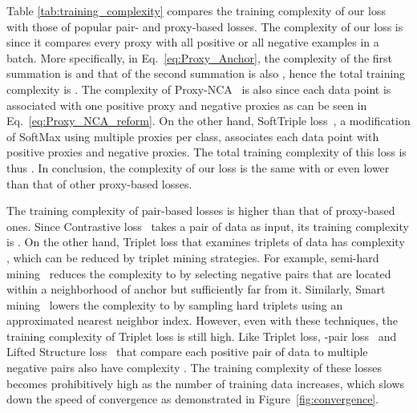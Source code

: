 \documentclass[10pt,twocolumn,letterpaper]{article}
\begin{document}
Table \ref{tab:training_complexity} compares the training complexity of our loss with those of popular pair- and proxy-based losses. 
The complexity of our loss is  since it compares every proxy with all positive or all negative examples in a batch. 
More specifically, in Eq.~\eqref{eq:Proxy_Anchor}, the complexity of the first summation is  and that of the second summation is also , hence the total training complexity is .
The complexity of Proxy-NCA~\cite{movshovitz2017no} is also  since each data point is associated with one positive proxy and  negative proxies as can be seen in Eq.~\eqref{eq:Proxy_NCA_reform}. 
On the other hand, SoftTriple loss~\cite{Qian_2019_ICCV}, a modification of SoftMax using multiple proxies per class, associates each data point with  positive proxies and  negative proxies. 
The total training complexity of this loss is thus . 
In conclusion, the complexity of our loss is the same with or even lower than that of other proxy-based losses.



The training complexity of pair-based losses is higher than that of proxy-based ones.
Since Contrastive loss~\cite{Bromley1994, Chopra2005, Hadsell2006} takes a pair of data as input, its training complexity is .
On the other hand, Triplet loss that examines triplets of data has complexity , which can be reduced by triplet mining strategies.
For example, semi-hard mining~\cite{Schroff2015} reduces the complexity to  by selecting negative pairs that are located within a neighborhood of anchor but sufficiently far from it. 
Similarly, Smart mining~\cite{Harwood_2017_ICCV} lowers the complexity to  by sampling hard triplets using an approximated nearest neighbor index. 
However, even with these techniques, the training complexity of Triplet loss is still high.
Like Triplet loss, -pair loss~\cite{Sohn_nips2016} and Lifted Structure loss~\cite{songCVPR16} that compare each positive pair of data to multiple negative pairs also have complexity .
The training complexity of these losses becomes prohibitively high as the number of training data  increases, which slows down the speed of convergence as demonstrated in Figure~\ref{fig:convergence}.
\end{document}
